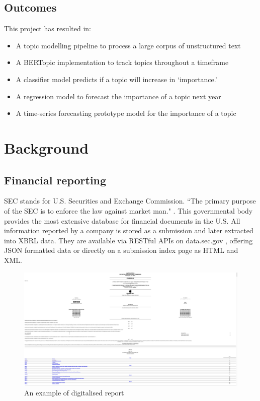 \documentclass[12pt,MSc,a4paper,oneside]{muthesis}
\begin{document}
\section{Outcomes}
This project has resulted in:
\begin{itemize}
  \item A topic modelling pipeline to process a large corpus of unstructured
    text
  \item A BERTopic implementation to track topics throughout a timeframe
  \item A classifier model predicts if a topic will increase in ‘importance.’
  \item A regression model to forecast the importance of a topic next year
  \item A time-series forecasting prototype model for the importance of a topic
\end{itemize}

\chapter{Background}

\section{Financial reporting}
SEC stands for U.S. Securities and Exchange Commission. “The primary purpose of the SEC is to enforce the law against market man." \cite{wiki:sec}. This governmental body provides the most extensive database for financial documents in the U.S. All information reported by a company is stored as a submission and later extracted into XBRL data. They are available via RESTful APIs on data.sec.gov \cite{sec-api-docs}, offering JSON formatted data or directly on a submission index page as HTML and XML.

\begin{figure}[h]
  \centering
  \includegraphics[scale=0.1]{images/Example Annual Report.png}
  \caption{An example of digitalised report \cite{digitalised-report-example}}
\end{figure}
\end{document}
